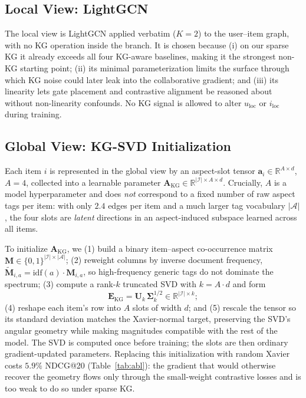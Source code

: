 \documentclass[12pt,a4paper]{article}
\begin{document}
\subsection{Local View: LightGCN}

The local view is LightGCN applied verbatim ($K{=}2$) to the user--item graph, with no KG operation inside the branch. It is chosen because (i) on our sparse KG it already exceeds all four KG-aware baselines, making it the strongest non-KG starting point; (ii) its minimal parameterization limits the surface through which KG noise could later leak into the collaborative gradient; and (iii) its linearity lets gate placement and contrastive alignment be reasoned about without non-linearity confounds. No KG signal is allowed to alter $u_{\mathrm{loc}}$ or $i_{\mathrm{loc}}$ during training.

\subsection{Global View: KG-SVD Initialization}

Each item $i$ is represented in the global view by an aspect-slot tensor $\mathbf{a}_i\in\mathbb{R}^{A\times d}$, $A{=}4$, collected into a learnable parameter $\mathbf{A}_{\mathrm{KG}}\in\mathbb{R}^{|\mathcal{I}|\times A\times d}$. Crucially, $A$ is a model hyperparameter and does \emph{not} correspond to a fixed number of raw aspect tags per item: with only $2.4$ edges per item and a much larger tag vocabulary $|\mathcal{A}|$, the four slots are \emph{latent} directions in an aspect-induced subspace learned across all items.

To initialize $\mathbf{A}_{\mathrm{KG}}$, we (1) build a binary item--aspect co-occurrence matrix $\mathbf{M}\in\{0,1\}^{|\mathcal{I}|\times|\mathcal{A}|}$; (2) reweight columns by inverse document frequency, $\tilde{\mathbf{M}}_{i,a}=\mathrm{idf}(a)\cdot\mathbf{M}_{i,a}$, so high-frequency generic tags do not dominate the spectrum; (3) compute a rank-$k$ truncated SVD with $k=A\cdot d$ and form
\begin{equation}
\label{eq:svd}
\mathbf{E}_{\mathrm{KG}}=\mathbf{U}_k\,\boldsymbol{\Sigma}_k^{1/2}\in\mathbb{R}^{|\mathcal{I}|\times k};
\end{equation}
(4) reshape each item's row into $A$ slots of width $d$; and (5) rescale the tensor so its standard deviation matches the Xavier-normal target, preserving the SVD's angular geometry while making magnitudes compatible with the rest of the model. The SVD is computed once before training; the slots are then ordinary gradient-updated parameters. Replacing this initialization with random Xavier costs $5.9\%$ NDCG@20 (Table~\ref{tab:abl}): the gradient that would otherwise recover the geometry flows only through the small-weight contrastive losses and is too weak to do so under sparse KG.
\end{document}

